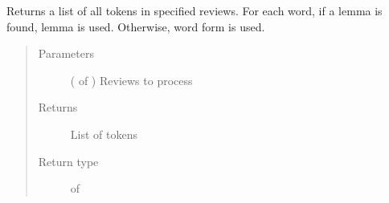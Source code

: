 \documentclass[letterpaper,10pt,english]{sphinxmanual}
\begin{document}
\begin{fulllineitems}
\label{\detokenize{learning:loacore.learning.word2vec.get_tokens_list}}
Returns a list of all tokens in specified reviews. For each word, if a lemma is found, lemma is used. Otherwise,
word form is used.
\begin{quote}\begin{description}
\item[{Parameters}] \leavevmode
{} ( of {\hyperref[\detokenize{classes:loacore.classes.classes.Review}]{}}) \textendash{} Reviews to process

\item[{Returns}] \leavevmode
List of tokens

\item[{Return type}] \leavevmode
{} of 

\end{description}\end{quote}

\end{fulllineitems}

\end{document}
